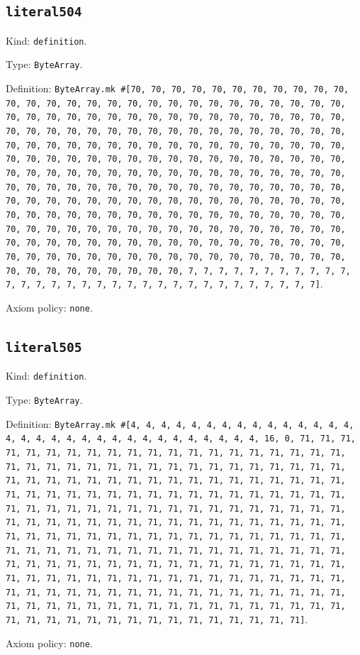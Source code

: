\documentclass[11pt]{article}
\begin{document}
\subsection*{\texttt{literal504}}
\noindent Kind: \texttt{definition}.\par
\noindent Type: \texttt{ByteArray}.\par
\noindent Definition: \texttt{ByteArray.mk \#[70, 70, 70, 70, 70, 70, 70, 70, 70, 70, 70, 70, 70, 70, 70, 70, 70, 70, 70, 70, 70, 70, 70, 70, 70, 70, 70, 70, 70, 70, 70, 70, 70, 70, 70, 70, 70, 70, 70, 70, 70, 70, 70, 70, 70, 70, 70, 70, 70, 70, 70, 70, 70, 70, 70, 70, 70, 70, 70, 70, 70, 70, 70, 70, 70, 70, 70, 70, 70, 70, 70, 70, 70, 70, 70, 70, 70, 70, 70, 70, 70, 70, 70, 70, 70, 70, 70, 70, 70, 70, 70, 70, 70, 70, 70, 70, 70, 70, 70, 70, 70, 70, 70, 70, 70, 70, 70, 70, 70, 70, 70, 70, 70, 70, 70, 70, 70, 70, 70, 70, 70, 70, 70, 70, 70, 70, 70, 70, 70, 70, 70, 70, 70, 70, 70, 70, 70, 70, 70, 70, 70, 70, 70, 70, 70, 70, 70, 70, 70, 70, 70, 70, 70, 70, 70, 70, 70, 70, 70, 70, 70, 70, 70, 70, 70, 70, 70, 70, 70, 70, 70, 70, 70, 70, 70, 70, 70, 70, 70, 70, 70, 70, 70, 70, 70, 70, 70, 70, 70, 70, 70, 70, 70, 70, 70, 70, 70, 70, 70, 70, 70, 70, 70, 70, 70, 70, 70, 70, 70, 70, 70, 70, 70, 70, 70, 70, 70, 70, 70, 70, 70, 70, 70, 70, 7, 7, 7, 7, 7, 7, 7, 7, 7, 7, 7, 7, 7, 7, 7, 7, 7, 7, 7, 7, 7, 7, 7, 7, 7, 7, 7, 7, 7, 7, 7, 7]}.\par
\noindent Axiom policy: \texttt{none}.\par
\subsection*{\texttt{literal505}}
\noindent Kind: \texttt{definition}.\par
\noindent Type: \texttt{ByteArray}.\par
\noindent Definition: \texttt{ByteArray.mk \#[4, 4, 4, 4, 4, 4, 4, 4, 4, 4, 4, 4, 4, 4, 4, 4, 4, 4, 4, 4, 4, 4, 4, 4, 4, 4, 4, 4, 4, 4, 4, 4, 16, 0, 71, 71, 71, 71, 71, 71, 71, 71, 71, 71, 71, 71, 71, 71, 71, 71, 71, 71, 71, 71, 71, 71, 71, 71, 71, 71, 71, 71, 71, 71, 71, 71, 71, 71, 71, 71, 71, 71, 71, 71, 71, 71, 71, 71, 71, 71, 71, 71, 71, 71, 71, 71, 71, 71, 71, 71, 71, 71, 71, 71, 71, 71, 71, 71, 71, 71, 71, 71, 71, 71, 71, 71, 71, 71, 71, 71, 71, 71, 71, 71, 71, 71, 71, 71, 71, 71, 71, 71, 71, 71, 71, 71, 71, 71, 71, 71, 71, 71, 71, 71, 71, 71, 71, 71, 71, 71, 71, 71, 71, 71, 71, 71, 71, 71, 71, 71, 71, 71, 71, 71, 71, 71, 71, 71, 71, 71, 71, 71, 71, 71, 71, 71, 71, 71, 71, 71, 71, 71, 71, 71, 71, 71, 71, 71, 71, 71, 71, 71, 71, 71, 71, 71, 71, 71, 71, 71, 71, 71, 71, 71, 71, 71, 71, 71, 71, 71, 71, 71, 71, 71, 71, 71, 71, 71, 71, 71, 71, 71, 71, 71, 71, 71, 71, 71, 71, 71, 71, 71, 71, 71, 71, 71, 71, 71, 71, 71, 71, 71, 71, 71, 71, 71, 71, 71, 71, 71, 71, 71, 71, 71, 71, 71, 71, 71, 71, 71, 71, 71, 71, 71, 71, 71]}.\par
\noindent Axiom policy: \texttt{none}.\par
\end{document}
